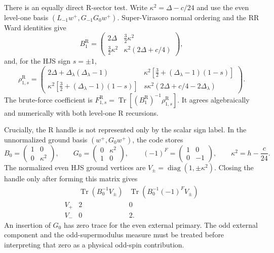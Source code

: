 \documentclass[11pt]{article}
\newcommand{\R}{\mathrm{R}}
\begin{document}
There is an equally direct R-sector test.  Write
$\kappa^2=\Delta-c/24$ and use the even level-one basis
$(L_{-1}w^+,G_{-1}G_0w^+)$.  Super-Virasoro normal ordering and the RR Ward
identities give
\begin{equation}
 B_1^\R=
 \begin{pmatrix}
 2\Delta&\frac32\kappa^2\\
 \frac32\kappa^2&\kappa^2(2\Delta+c/4)
 \end{pmatrix},
 \label{eq:torus-r-direct-gram}
\end{equation}
and, for the HJS sign $s=\pm1$,
\begin{equation}
 \rho_{1,s}^\R=
 \begin{pmatrix}
 2\Delta+\Delta_\lambda(\Delta_\lambda-1)&
 \kappa^2[\frac32+(\Delta_\lambda-1)(1-s)]\\
 \kappa^2[\frac32+(\Delta_\lambda-1)(1-s)]&
 s\kappa^2(2\Delta+c/4-2\Delta_\lambda)
 \end{pmatrix}.
 \label{eq:torus-r-direct-vertex}
\end{equation}
The brute-force coefficient is
$F_{1,s}^\R=\operatorname{Tr}[(B_1^\R)^{-1}\rho_{1,s}^\R]$.
It agrees algebraically and numerically with both level-one R recursions.

Crucially, the R handle is not represented only by the scalar sign label.
In the unnormalized ground basis $(w^+,G_0w^+)$, the code stores
\begin{equation}
 B_0=\begin{pmatrix}1&0\\0&\kappa^2\end{pmatrix},
 \qquad
 G_0=\begin{pmatrix}0&\kappa^2\\1&0\end{pmatrix},
 \qquad
 (-1)^F=\begin{pmatrix}1&0\\0&-1\end{pmatrix},
 \qquad \kappa^2=h-\frac c{24}.
 \label{eq:torus-r-ground-matrices}
\end{equation}
The normalized even HJS ground vertices are
$V_\pm=\operatorname{diag}(1,\pm\kappa^2)$.  Closing the handle only after
forming this matrix gives
\begin{equation}
 \begin{array}{c|cc}
 &\operatorname{Tr}(B_0^{-1}V_\pm)
 &\operatorname{Tr}(B_0^{-1}(-1)^F V_\pm)\\
 \hline
 V_+&2&0\\
 V_-&0&2 .
 \end{array}
 \label{eq:torus-r-ground-contractions}
\end{equation}
An insertion of $G_0$ has zero trace for the even external primary.  The
odd external component and the odd-supermodulus measure must be treated
before interpreting that zero as a physical odd-spin contribution.
\end{document}
